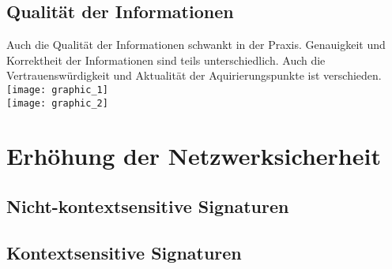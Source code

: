 \subsection{Qualität der Informationen}
Auch die Qualität der Informationen schwankt in der Praxis. Genauigkeit und Korrektheit der Informationen sind teils unterschiedlich. Auch die Vertrauenswürdigkeit und Aktualität der Aquirierungspunkte ist verschieden.
\texttt{[image: graphic\_1]}\\
\texttt{[image: graphic\_2]}
\pagebreak

\section{Erhöhung der Netzwerksicherheit}
\subsection{Nicht-kontextsensitive Signaturen}
\subsection{Kontextsensitive Signaturen} 
